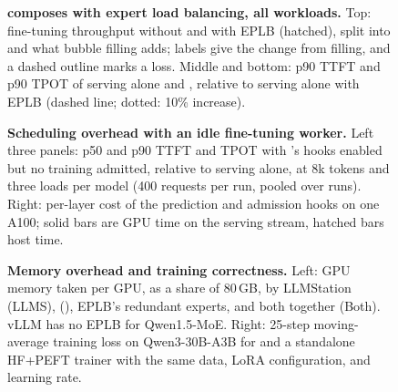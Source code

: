 \begin{figure}[t]
  \begin{minipage}[t]{\columnwidth}
    \vspace{0pt}\centering
  \caption{\textbf{Using expert-parallel bubbles.}
    Top: accounting of available non-straggler bubble time at
    8k tokens and 2 requests/s. Bottom: total bubble time created
    while different colocated execution policies run, normalized
    to serving alone, for \cfgColo (Coloc.), \cfgUnthr (Unthr.),
    \cfgThrottled (Thrott.), \sys{} (\sysshort), and \sys{} with one
    fine-tuning chain (\sysshort, 1 ch.); \S\ref{sec:eval-latency} defines
    the configurations. The accounting categories add up to 104\%: 46\,ms
    (3.8\% of bubble time) fall into two categories.}
  \label{fig:eval-bubble-use}
  \end{minipage}\hfill
  \begin{minipage}[t]{\columnwidth}
    \vspace{0pt}\centering
  \caption{\textbf{\sys{} composes with expert load balancing, all
    workloads.}
    Top: fine-tuning throughput without and with \ac{EPLB}
    (hatched), split into \cfgOptColo{} and what bubble filling adds;
    labels give the change from filling, and a dashed outline marks a
    loss. Middle and bottom: p90 \ac{TTFT} and p90 \ac{TPOT} of
    serving alone and \sys{}, relative to serving alone with \ac{EPLB}
    (dashed line; dotted: 10\% increase).}
  \label{fig:appx-eplb}
  \end{minipage}
\end{figure}

\begin{figure}[t]
  \centering
  \caption{\textbf{Scheduling overhead with an idle fine-tuning worker.}
    Left three panels: p50 and p90 \ac{TTFT} and \ac{TPOT} with \sys{}'s
    hooks enabled but no training admitted, relative to serving alone,
    at 8k tokens and three loads per model (400 requests per run,
    pooled over runs). Right: per-layer cost of the prediction and
    admission hooks on one A100; solid bars are GPU time on the serving
    stream, hatched bars host time.}
  \label{fig:appx-sched-overhead}
\end{figure}

\begin{figure}[t]
  \centering
  \caption{\textbf{Memory overhead and training correctness.}
    Left: GPU memory taken per GPU, as a share of 80\,GB, by LLMStation
    (LLMS), \sys{} (\sysshort), \ac{EPLB}'s redundant experts, and both together
    (Both).
    vLLM has no \ac{EPLB} for Qwen1.5-MoE. Right: 25-step moving-average
    training loss on Qwen3-30B-A3B for \sys{} and a standalone HF+PEFT
    trainer with the same data, LoRA configuration, and learning rate.}
  \label{fig:appx-overheads}

\end{figure}

